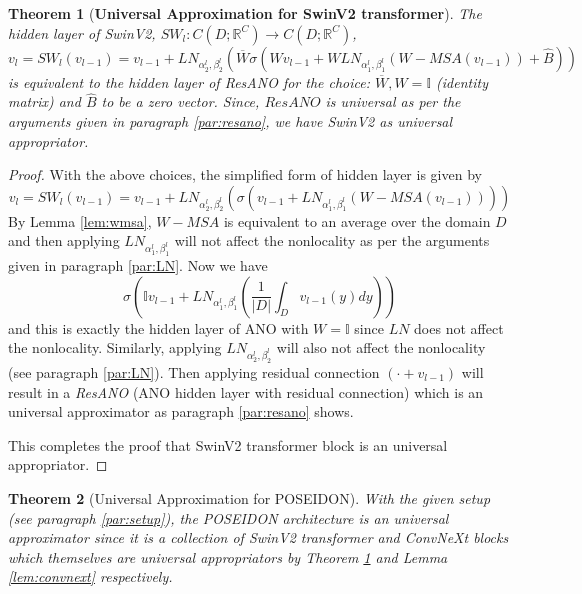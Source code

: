 \documentclass[reqno,10pt]{amsart}
\theoremstyle{plain}
\newtheorem{thm}{Theorem}
\theoremstyle{definition}
\newcommand{\bb}[1]{\mathbb{#1}}
\begin{document}
\begin{thm}[{\bf Universal Approximation for SwinV2 transformer}] \label{thm:swinv2}
    The hidden layer of SwinV2, $SW_l : C(D;\bb R^C) \to C(D;\bb R^C)$,
    $$ v_l = SW_l(v_{l-1}) = v_{l-1} + LN_{\alpha_2^l, \beta_2^l} \left(\overline{W} \sigma \left( Wv_{l-1} + WLN_{\alpha_1^l,\beta_1^l}(W-MSA(v_{l-1})) + \hat{B}\right)\right)$$
    is equivalent to the hidden layer of ResANO for the choice: $\overline{W}, W = \bb I$ (identity matrix) and $\hat{B}$ to be a zero vector. Since, $ResANO$ is universal as per the arguments given in paragraph \ref{par:resano}, we have SwinV2 as universal appropriator.
\end{thm}
\begin{proof}
    With the above choices, the simplified form of hidden layer is given by
    $$ v_l = SW_l(v_{l-1}) = v_{l-1} + LN_{\alpha_2^l, \beta_2^l} \left(\sigma \left(v_{l-1} + LN_{\alpha_1^l,\beta_1^l}(W-MSA(v_{l-1}))\right)\right)$$
    By Lemma \ref{lem:wmsa}, $W-MSA$ is equivalent to an average over the domain $D$ and then applying $LN_{\alpha_1^l, \beta_1^l}$ will not affect the nonlocality as per the arguments given in paragraph \ref{par:LN}. Now we have
    $$ \sigma\left(\bb Iv_{l-1} + LN_{\alpha_1^l, \beta_1^l}\left( \frac{1}{|D|} \int_D v_{l-1}(y)dy\right) \right)$$ and this is exactly the hidden layer of ANO \cite{SL2024} with $W = \bb I$ since $LN$ does not affect the nonlocality. Similarly, applying $LN_{\alpha_2^l, \beta_2^l}$ will also not affect the nonlocality (see paragraph \ref{par:LN}).
    Then applying residual connection $(\cdot + v_{l-1})$ will result in a {\it ResANO} (ANO hidden layer with residual connection) which is an universal approximator as paragraph \ref{par:resano} shows.
    
    \noindent This completes the proof that SwinV2 transformer block is an universal appropriator.
\end{proof}
\begin{thm}[Universal Approximation for POSEIDON]
    With the given setup (see paragraph \ref{par:setup}), the POSEIDON architecture is an universal approximator since it is a collection of SwinV2 transformer and ConvNeXt blocks which themselves are universal appropriators by Theorem \ref{thm:swinv2} and Lemma \ref{lem:convnext} respectively.
\end{thm}
\end{document}

